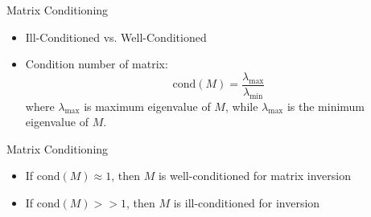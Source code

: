 \begin{frame}
Matrix Conditioning
\begin{itemize}
  \item Ill-Conditioned vs. Well-Conditioned
  \item Condition number of matrix:
\[\text{cond}(M)=\dfrac{\lambda_{\text{max}}}{\lambda_{\text{min}}}\]
where $\lambda_{\text{max}}$ is maximum eigenvalue of $M$, while $\lambda_{\text{max}}$ is the minimum eigenvalue of $M$.
\end{itemize} 
\end{frame}

\begin{frame}
Matrix Conditioning
\begin{itemize}
  \item If $\text{cond}(M)\approx 1$, then $M$ is well-conditioned for matrix inversion
  \item If $\text{cond}(M)>>1$, then $M$ is ill-conditioned for inversion
\end{itemize} 
\end{frame}

